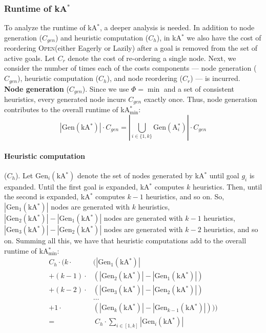 \documentclass[smallextended]{svjour3}       %
\newcommand{\kastar}{kA$^*$\xspace}
\newcommand{\kastarvar}[1]{\textup{kA}$^*_{#1}$\xspace}
\newcommand{\kastarmin}{\kastarvar{\min}}
\newcommand{\astari}[1]{A$^*_{#1}$\xspace}
\newcommand{\Gen}{\text{Gen}}
\newcommand{\open}{\textsc{Open}\xspace}
\begin{document}
\subsubsection{Runtime of \kastar}

To analyze the runtime of \kastar, a deeper analysis is needed.
In addition to node generation ($C_{gen}$) and heuristic computation ($C_h$), in \kastar we also have the cost of reordering \open (either Eagerly or Lazily) after a goal is removed from the set of active goals. Let $C_r$ denote the cost of re-ordering a single node. 
Next, we consider the number of times each of the costs components --- node generation ($C_{gen}$), heuristic computation ($C_h$), and node reordering ($C_r$) --- is incurred.\\

\noindent \textbf{Node generation} ($C_{gen}$).
Since we use $\Phi=\min$ and a set of consistent heuristics, every generated node incurs $C_{gen}$ exactly once.
Thus, node generation contributes to the overall runtime of \kastarmin:
\[
|\Gen(\text{\kastar})|\cdot C_{gen} = |\bigcup_{i\in{\{1,k\}}} \Gen(\text{\astari{i}})|\cdot C_{gen}
\]
\paragraph{Heuristic computation} ($C_{h}$).
Let $\Gen_i(\text{\kastar})$ denote the set of nodes generated by \kastar until goal $g_i$ is expanded.
Until the first goal is expanded, \kastar computes $k$ heuristics.
Then, until the second is expanded, \kastar computes $k-1$ heuristics, and so on.
So, $|\Gen_1(\text{\kastar})|$ nodes are generated with $k$ heuristics, $|\Gen_2(\text{\kastar})|-|\Gen_1(\text{\kastar})|$ nodes are generated with $k-1$ heuristics, $|\Gen_3(\text{\kastar})|-|\Gen_2(\text{\kastar})|$ nodes are generated with $k-2$ heuristics, and so on.
Summing all this, we have that heuristic computations add to the overall runtime of \kastarmin:
\begin{align*}
  C_h\cdot ( k \cdot & (|\Gen_1(\text{\kastar})| \\
   + (k-1) \cdot&(|\Gen_2(\text{\kastar})|-|\Gen_1(\text{\kastar})|)\\
   + (k-2) \cdot&(|\Gen_3(\text{\kastar})|-|\Gen_2(\text{\kastar})|) \\
   &\ldots\\
   + 1 \cdot&(|\Gen_k(\text{\kastar})|-|\Gen_{k-1}(\text{\kastar})|)))\\
   =& ~ C_h \cdot \sum_{i\in[1,k]} |\Gen_i(\text{\kastar})|
\end{align*}
\end{document}
